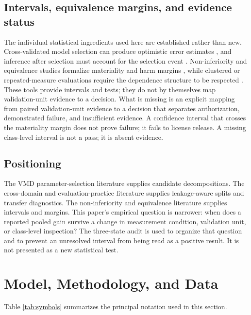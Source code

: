 \documentclass[11pt]{article}
\begin{document}
\subsection{Intervals, equivalence margins, and evidence status}

The individual statistical ingredients used here are established rather than
new. Cross-validated model selection can produce optimistic error estimates
\citep{varma2006bias}, and inference after selection must account for the
selection event \citep{lee2016selective}. Non-inferiority and equivalence
studies formalize materiality and harm margins
\citep{piaggio2006noninferiority}, while clustered or repeated-measure
evaluations require the dependence structure to be respected
\citep{liang1986longitudinal}. These tools provide intervals and tests; they do
not by themselves map validation-unit evidence to a decision. What is missing
is an explicit mapping from paired validation-unit evidence to a decision that
separates authorization, demonstrated failure, and insufficient evidence. A
confidence interval that crosses the materiality margin does not prove failure;
it fails to license release. A missing class-level interval is not a pass; it
is absent evidence.

\subsection{Positioning}

The VMD parameter-selection literature supplies candidate decompositions. The
cross-domain and evaluation-practice literature supplies leakage-aware splits
and transfer diagnostics. The non-inferiority and equivalence literature
supplies intervals and margins. This paper's empirical question is narrower:
when does a reported pooled gain survive a change in measurement condition,
validation unit, or class-level inspection? The three-state audit is used to
organize that question and to prevent an unresolved interval from being read as
a positive result. It is not presented as a new statistical test.

\section{Model, Methodology, and Data}

Table \ref{tab:symbols} summarizes the principal notation used in this
section.
\end{document}

